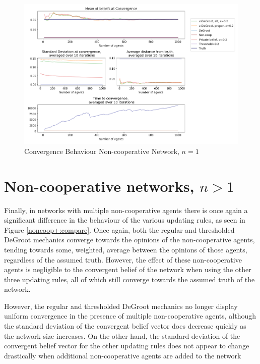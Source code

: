 \documentclass[a4paper, 12pt]{report}
\begin{document}
\begin{center}
    \begin{figure}[!htbp]
        \centering
        \includegraphics[width=1.2\textwidth]{ThesisKI/Images/WisdomCompare1.png}
        \caption{Convergence Behaviour Non-cooperative Network, $n=1$}
        \label{noncoop1:compare}
    \end{figure}
\end{center}

\newpage

\section{Non-cooperative networks, $n > 1$}

Finally, in networks with multiple non-cooperative agents there is once again a significant difference in the behaviour of the various updating rules, as seen in Figure \ref{noncoop+:compare}. Once again, both the regular and thresholded DeGroot mechanics converge towards the opinions of the non-cooperative agents, tending towards some, weighted, average between the opinions of those agents, regardless of the assumed truth. However, the effect of these non-cooperative agents is negligible to the convergent belief of the network when using the other three updating rules, all of which still converge towards the assumed truth of the network. 

\noindent However, the regular and thresholded DeGroot mechanics no longer display uniform convergence in the presence of multiple non-cooperative agents, although the standard deviation of the convergent belief vector does decrease quickly as the network size increases. On the other hand, the standard deviation of the convergent belief vector for the other updating rules does not appear to change drastically when additional non-cooperative agents are added to the network
\end{document}
